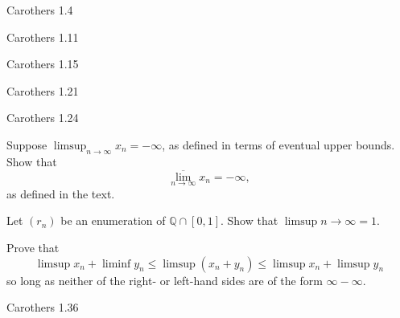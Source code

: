 \documentclass[minion]{homework}
\begin{document}
\begin{aproblems}

\hproblem Carothers 1.4

\hproblem Carothers 1.11

\hproblem Carothers 1.15

\hproblem Carothers 1.21

\hproblem Carothers 1.24

\hproblem Suppose $\limsup_{n\rightarrow\infty} x_n = -\infty$, as defined in terms
of eventual upper bounds.  Show that $$
\overline{\lim_{n\rightarrow\infty}} x_n =-\infty,
$$ as defined in the text.

\hproblem Let $(r_n)$ be an enumeration of $\mathbb Q\cap [0,1]$.  Show that
$\limsup{n\rightarrow\infty} = 1$.


\hproblem Prove that
$$
\limsup x_n + \liminf y_n \le \limsup (x_n+y_n) \le \limsup x_n + \limsup y_n
$$
so long as neither of the right- or left-hand sides are of the form $\infty-\infty$.

\hproblem Carothers 1.36

\end{aproblems}
\end{document}
